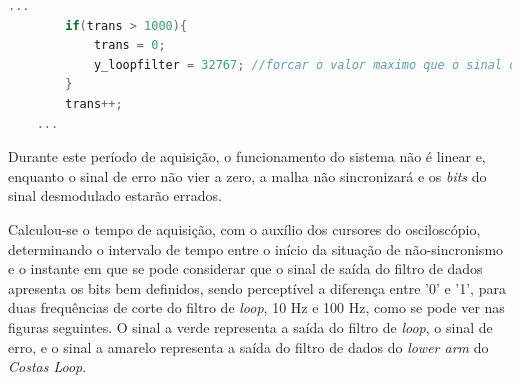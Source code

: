 \documentclass[11pt]{article}
\numberwithin{equation}{section}
\begin{document}
{\begin{lstlisting}[language=C]
	...
		if(trans > 1000){
			trans = 0;
			y_loopfilter = 32767; //forcar o valor maximo que o sinal de erro pode tomar
		}	
		trans++;
	...
\end{lstlisting}

Durante este período de aquisição, o funcionamento do sistema não é linear e, enquanto o sinal de erro não vier a zero, a malha não sincronizará e os \textit{bits} do sinal desmodulado estarão errados.

Calculou-se o tempo de aquisição, com o auxílio dos cursores do osciloscópio, determinando o intervalo de tempo entre o início da situação de não-sincronismo  e o instante em que se pode considerar que o sinal de saída do filtro de dados apresenta os bits bem definidos, sendo perceptível a diferença entre '0' e '1', para duas frequências de corte do filtro de \textit{loop}, 10 Hz e 100 Hz, como se pode ver nas figuras seguintes. O sinal a verde representa a saída do filtro de \textit{loop}, o sinal de erro, e o sinal a amarelo representa a saída do filtro de dados do \textit{lower arm} do \textit{Costas Loop}.


}
\end{document}
